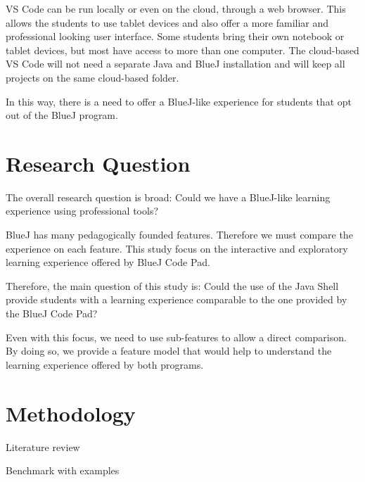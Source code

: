 \documentclass{article}
\begin{document}

VS Code can be run locally or even on the cloud, through a web browser. This allows the students to use tablet devices and also offer a more familiar and professional looking user interface. Some students bring their own notebook or tablet devices, but most have access to more than one computer. The cloud-based VS Code will not need a separate Java and BlueJ installation and will keep all projects on the same cloud-based folder.

In this way, there is a need to offer a BlueJ-like experience for students that opt out of the BlueJ program. 

\section{Research Question}

The overall research question is broad: Could we have a BlueJ-like learning experience using professional tools?

BlueJ has many pedagogically founded features. Therefore we must compare the experience on each feature. This study focus on the interactive and exploratory learning experience offered by BlueJ Code Pad.

Therefore, the main question of this study is:
Could the use of the Java Shell provide students with a learning experience comparable to the one provided by the BlueJ Code Pad?

Even with this focus, we need to use sub-features to allow a direct comparison. By doing so, we provide a feature model that would help to understand the learning experience offered by both programs.




\section{Methodology}

Literature review

Benchmark with examples
\end{document}
